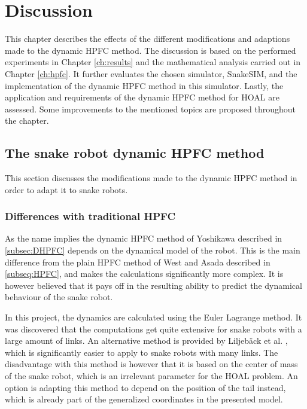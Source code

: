 \chapter{Discussion}\label{ch:discussion}

This chapter describes the effects of the different modifications and adaptions made to the dynamic HPFC method. The discussion is based on the performed experiments in Chapter \ref{ch:results} and the mathematical analysis carried out in Chapter \ref{ch:hpfc}. It further evaluates the chosen simulator, SnakeSIM, and the implementation of the dynamic HPFC method in this simulator. Lastly, the application and requirements of the dynamic HPFC method for HOAL are assessed. Some improvements to the mentioned topics are proposed throughout the chapter.

\section{The snake robot dynamic HPFC method}

This section discusses the modifications made to the dynamic HPFC method in order to adapt it to snake robots.

\subsection{Differences with traditional HPFC}\label{subsec:dis-diff}

As the name implies the dynamic HPFC method of Yoshikawa \cite{yoshikawa1987dynamic} described in \ref{subsec:DHPFC} depends on the dynamical model of the robot. This is the main difference from the plain HPFC method of West and Asada \cite{west1985method} described in \ref{subseq:HPFC}, and makes the calculations significantly more complex. It is however believed that it pays off in the resulting ability to predict the dynamical behaviour of the snake robot.

In this project, the dynamics are calculated using the Euler Lagrange method. It was discovered that the computations get quite extensive for snake robots with a large amount of links. An alternative method is provided by Liljebäck et al. \cite{liljeback2012snake}, which is significantly easier to apply to snake robots with many links. The disadvantage with this method is however that it is based on the center of mass of the snake robot, which is an irrelevant parameter for the HOAL problem. %
An option is adapting this method to depend on the position of the tail instead, which is already part of the generalized coordinates in the presented model.

